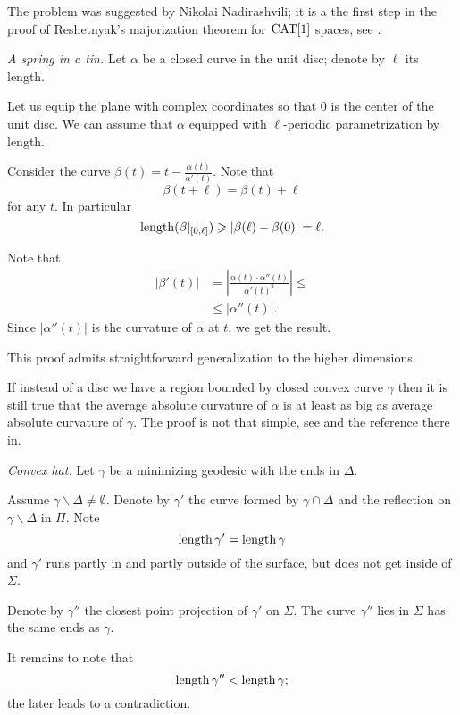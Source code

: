 The problem was suggested by Nikolai Nadirashvili;
it is a the first step in the proof of Reshetnyak's majorization theorem for $\operatorname{\rm CAT}\nolimits[1]$ spaces, see \cite{akp}.
 


 \textit{A spring in a tin.}
Let $\alpha$ be a closed curve in the unit disc;
denote by $\ell$ its length.

Let us equip the plane with complex coordinates so that $0$ is the center of the unit disc.
We can assume that $\alpha$ equipped with $\ell$-periodic parametrization by length.

Consider the curve $\beta(t)=t-\tfrac{\alpha(t)}{\alpha'(t)}$.
Note that 
\[\beta(t+\ell)=\beta(t)+\ell\] 
for any $t$.
In particular 
\[\operatorname{\rm length} (\beta|_{[0,\ell]}) 
\geqslant 
|\beta(\ell)-\beta(0)|
=
\ell.\]

Note that 
\begin{align*}
|\beta'(t)|&=|\tfrac{\alpha(t)\cdot\alpha''(t)}{\alpha'(t)^2}|\le
\\
&\le|\alpha''(t)|.
\end{align*}
Since $|\alpha''(t)|$ is the curvature of $\alpha$ at $t$,
we get the result.

This proof admits straightforward generalization to the higher dimensions.

If instead of a disc we have a region bounded by closed convex curve $\gamma$ then it is still true that the average absolute curvature of $\alpha$ is at least as big as average absolute curvature of $\gamma$. 
The proof is not that simple, see \cite{tabachnikov} and the reference there in.


\textit{Convex hat.}
Let $\gamma$ be a minimizing geodesic with the ends in $\Delta$.

Assume $\gamma\backslash\Delta\ne\emptyset$.
Denote by $\gamma'$ the curve formed by $\gamma\cap \Delta$ 
and the reflection on $\gamma\backslash\Delta$ in $\Pi$.
Note 
\[\operatorname{\rm length}\gamma'=\operatorname{\rm length}\gamma\]
and $\gamma'$ runs partly in and partly outside of the surface, but does not get inside of $\Sigma$.

Denote by $\gamma''$ the closest point projection of $\gamma'$ on $\Sigma$.
The curve $\gamma''$ lies in $\Sigma$ has the same ends as $\gamma$.

It remains to note that 
\[\operatorname{\rm length}\gamma''<\operatorname{\rm length}\gamma;\]
the later leads to a contradiction.


